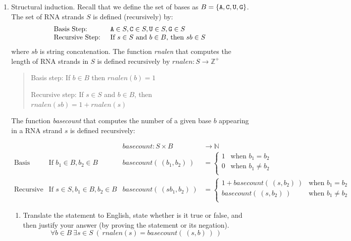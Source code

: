 \begin{enumerate}[labelindent=0pt, leftmargin=0pt]
    \item Structural induction. Recall that we define the set of bases as $B  =  \{ \texttt{A}, \texttt{C}, \texttt{U}, \texttt{G} \}$.
The set of RNA strands $S$ is defined (recursively) by:
\[
\begin{array}{ll}
\textrm{Basis Step: } & \texttt{A} \in S, \texttt{C} \in S, \texttt{U} \in S, \texttt{G} \in S \\
\textrm{Recursive Step: } & \textrm{If } s \in S\textrm{ and }b \in B \textrm{, then }sb \in S
\end{array}
\]
where $sb$ is string concatenation. 
The function \textit{rnalen} that computes the length of RNA strands in $S$ is defined recursively by
$rnalen: S  \to \mathbb{Z}^+$


\begin{quote}
Basis step: If $b \in B$ then $rnalen(b)  = 1$

Recursive step: If $s \in S$ and $b \in B$, then $rnalen(sb)  = 1 + rnalen(s)$
\end{quote}

The function \textit{basecount} that computes the number of a given base 
$b$ appearing in a RNA strand $s$ is defined recursively:
    
\[
\begin{array}{llll}
& & \textit{basecount} : S \times B & \to \mathbb{N} \\
\textrm{Basis Step:} &  \textrm{If } b_1 \in B, b_2 \in B & \textit{basecount}(~(b_1, b_2)~) & =
        \begin{cases}
            1 & \textrm{when } b_1 = b_2 \\
            0 & \textrm{when } b_1 \neq b_2 \\
        \end{cases} \\
\textrm{Recursive Step:} & \textrm{If } s \in S, b_1 \in B, b_2 \in B &\textit{basecount}(~(s b_1, b_2)~) & =
        \begin{cases}
            1 + \textit{basecount}(~(s, b_2)~) & \textrm{when } b_1 = b_2 \\
            \textit{basecount}(~(s, b_2)~) & \textrm{when } b_1 \neq b_2 \\
        \end{cases}
\end{array}
\]
\begin{enumerate}
\item 
Translate the statement to English, state whether is it true or false, and then justify your answer (by proving the statement or its negation).
$$\forall b \in B ~\exists s \in S ~(~rnalen(s) = basecount(~(s,b)~)~)$$


\end{enumerate}
\end{enumerate}
